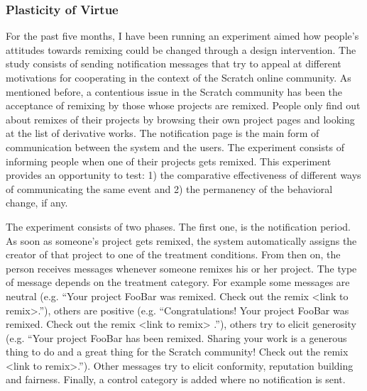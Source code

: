 
\subsubsection{Plasticity of Virtue}

For the past five months, I have been running an experiment aimed how people's attitudes towards remixing could be changed through a design intervention.
The study consists of sending notification messages that try to appeal at different motivations for cooperating in the context of the Scratch online community. 
As mentioned before, a contentious issue in the Scratch community has been the acceptance of remixing by those whose projects are remixed. 
People only find out about remixes of their projects by browsing their own project pages and looking at the list of derivative works. 
The notification page is the main form of communication between the system and the users.
The experiment consists of informing people when one of their projects gets remixed.
This experiment provides an opportunity to test: 1) the comparative effectiveness of different ways of communicating the same event and 2) the permanency of the behavioral change, if any. 

The experiment consists of two phases.
The first one, is the notification period. 
As soon as someone's project gets remixed, the system automatically assigns the creator of that project to one of the treatment conditions. 
From then on, the person receives messages whenever someone remixes his or her project. The type of message depends on the treatment category.
For example some messages are neutral (e.g. ``Your project FooBar was remixed. Check out the remix <link to remix>.''), 
others are positive (e.g. ``Congratulations! Your project FooBar was remixed. Check out the remix <link to remix> .''),
others try to elicit generosity (e.g. ``Your project FooBar has been remixed. Sharing your work is a generous thing to do and a great thing for the Scratch community! Check out the remix <link to remix>.'').
Other messages try to elicit conformity, reputation building and fairness.
Finally, a control category is added where no notification is sent.

